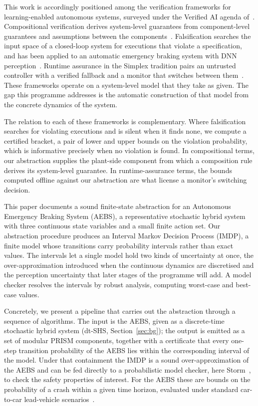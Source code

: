 \documentclass[11pt,a4paper]{article}
\theoremstyle{plain}
\theoremstyle{remark}
\begin{document}
	This work is accordingly positioned among the verification frameworks for learning-enabled autonomous systems, surveyed under the Verified AI agenda of~\cite{SSS20}. Compositional verification derives system-level guarantees from component-level guarantees and assumptions between the components~\cite{pasareanu2023assumptiongenerationverificationlearningenabled}. Falsification searches the input space of a closed-loop system for executions that violate a specification, and has been applied to an automatic emergency braking system with DNN perception~\cite{dreossi2018compositionalfalsificationcyberphysicalsystems}. Runtime assurance in the Simplex tradition pairs an untrusted controller with a verified fallback and a monitor that switches between them~\cite{simplex}. These frameworks operate on a system-level model that they take as given. The gap this programme addresses is the automatic construction of that model from the concrete dynamics of the system.
	
	The relation to each of these frameworks is complementary. Where falsification searches for violating executions and is silent when it finds none, we compute a certified bracket, a pair of lower and upper bounds on the violation probability, which is informative precisely when no violation is found. In compositional terms, our abstraction supplies the plant-side component from which a composition rule derives its system-level guarantee. In runtime-assurance terms, the bounds computed offline against our abstraction are what license a monitor's switching decision.
	
	This paper documents a sound finite-state abstraction for an Autonomous Emergency Braking System (AEBS), a representative stochastic hybrid system with three continuous state variables and a small finite action set. Our abstraction procedure produces an Interval Markov Decision Process (IMDP), a finite model whose transitions carry probability intervals rather than exact values. The intervals let a single model hold two kinds of uncertainty at once, the over-approximation introduced when the continuous dynamics are discretised and the perception uncertainty that later stages of the programme will add. A model checker resolves the intervals by robust analysis, computing worst-case and best-case values.
	
	Concretely, we present a pipeline that carries out the abstraction through a sequence of algorithms. The input is the AEBS, given as a discrete-time stochastic hybrid system (dt-SHS, Section~\ref{sec:bg}); the output is emitted as a set of modular PRISM components, together with a certificate that every one-step transition probability of the AEBS lies within the corresponding interval of the model. Under that containment the IMDP is a sound over-approximation of the AEBS and can be fed directly to a probabilistic model checker, here Storm~\cite{Storm}, to check the safety properties of interest. For the AEBS these are bounds on the probability of a crash within a given time horizon, evaluated under standard car-to-car lead-vehicle scenarios~\cite{EuroNCAP}.
	
\end{document}
